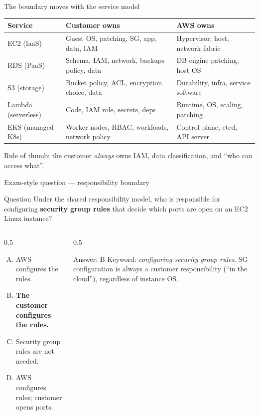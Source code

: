 \documentclass[aspectratio=169,10pt]{beamer}
\newcommand{\term}[1]{{\color{awsink}\textbf{#1}}}
\begin{document}
\begin{frame}{The boundary moves with the service model}
  \centering\small
  \renewcommand{\arraystretch}{1.25}
  \begin{tabular}{l l l}
    \toprule
    \textbf{Service} & \textbf{Customer owns} & \textbf{AWS owns}\\
    \midrule
    EC2 (IaaS)        & Guest OS, patching, SG, app, data, IAM & Hypervisor, host, network fabric\\
    RDS (PaaS)        & Schema, IAM, network, backups policy, data & DB engine patching, host OS\\
    S3 (storage)      & Bucket policy, ACL, encryption choice, data & Durability, infra, service software\\
    Lambda (serverless)& Code, IAM role, secrets, deps & Runtime, OS, scaling, patching\\
    EKS (managed K8s) & Worker nodes, RBAC, workloads, network policy & Control plane, etcd, API server\\
    \bottomrule
  \end{tabular}
  \vfill
  {\footnotesize\color{midgray}Rule of thumb: the customer \emph{always} owns IAM, data classification,
  and ``who can access what''.}
\end{frame}

\begin{frame}{Exam-style question --- responsibility boundary}
  \begin{block}{Question}
    Under the shared responsibility model, who is responsible for configuring \term{security group rules}
    that decide which ports are open on an EC2 Linux instance?
  \end{block}
  \begin{columns}[T]
    \begin{column}{0.5\textwidth}\small
      \begin{enumerate}[A.]
        \item AWS configures the rules.
        \item \textbf{The customer configures the rules.}
        \item Security group rules are not needed.
        \item AWS configures rules; customer opens ports.
      \end{enumerate}
    \end{column}
    \begin{column}{0.5\textwidth}
      \begin{block}{\footnotesize Answer: B}
        \footnotesize Keyword: \emph{configuring security group rules}. SG configuration is always
        a customer responsibility (``in the cloud''), regardless of instance OS.
      \end{block}
    \end{column}
  \end{columns}
\end{frame}
\end{document}
